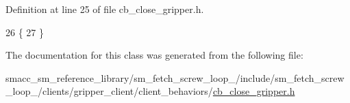 Definition at line 25 of file cb\+\_\+close\+\_\+gripper.\+h.


\begin{DoxyCode}
26     \{
27     \}
\end{DoxyCode}


The documentation for this class was generated from the following file\+:\begin{DoxyCompactItemize}
\item 
smacc\+\_\+sm\+\_\+reference\+\_\+library/sm\+\_\+fetch\+\_\+screw\+\_\+loop\+\_/include/sm\+\_\+fetch\+\_\+screw\+\_\+loop\+\_/clients/gripper\+\_\+client/client\+\_\+behaviors/\hyperlink{sm__fetch__screw__loop__1_2include_2sm__fetch__screw__loop__1_2clients_2gripper__client_2client_d6625d5819e5ea13537f3719cf856e91}{cb\+\_\+close\+\_\+gripper.\+h}\end{DoxyCompactItemize}
